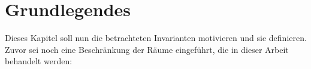 \section{Grundlegendes}
\label{sec:defs}

    Dieses Kapitel soll nun die betrachteten Invarianten motivieren und sie definieren. Zuvor sei noch eine Beschränkung der Räume eingeführt, die in dieser Arbeit behandelt werden:



